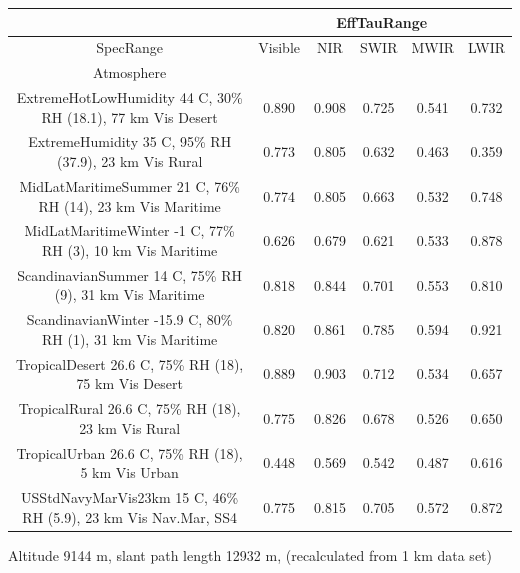 \documentclass{workpackage}
\begin{document}
\begin{center}

\begin{footnotesize}

\begin{tabular}{|c|c|c|c|c|c|}
\hline
&\multicolumn{5}{|c|}{EffTauRange}\\\hline
SpecRange&Visible&NIR&SWIR&MWIR&LWIR\\\hline
Atmosphere&&&&&\\\hline
ExtremeHotLowHumidity 44 C, 30\% RH (18.1), 77 km Vis Desert&0.890&0.908&0.725&0.541&0.732\\\hline
ExtremeHumidity 35 C, 95\% RH (37.9), 23 km Vis Rural&0.773&0.805&0.632&0.463&0.359\\\hline
MidLatMaritimeSummer 21 C, 76\% RH (14), 23 km Vis Maritime&0.774&0.805&0.663&0.532&0.748\\\hline
MidLatMaritimeWinter -1 C, 77\% RH (3), 10 km Vis Maritime&0.626&0.679&0.621&0.533&0.878\\\hline
ScandinavianSummer 14 C, 75\% RH (9), 31 km Vis Maritime&0.818&0.844&0.701&0.553&0.810\\\hline
ScandinavianWinter -15.9 C, 80\% RH (1), 31 km Vis Maritime&0.820&0.861&0.785&0.594&0.921\\\hline
TropicalDesert 26.6 C, 75\% RH (18), 75 km Vis Desert&0.889&0.903&0.712&0.534&0.657\\\hline
TropicalRural 26.6 C, 75\% RH (18), 23 km Vis Rural&0.775&0.826&0.678&0.526&0.650\\\hline
TropicalUrban 26.6 C, 75\% RH (18), 5 km Vis Urban&0.448&0.569&0.542&0.487&0.616\\\hline
USStdNavyMarVis23km 15 C, 46\% RH (5.9), 23 km Vis Nav.Mar, SS4&0.775&0.815&0.705&0.572&0.872\\\hline

\end{tabular}
\end{footnotesize}
\end{center}



Altitude 9144 m, slant path length 12932 m, (recalculated from 1 km data set)
\end{document}
